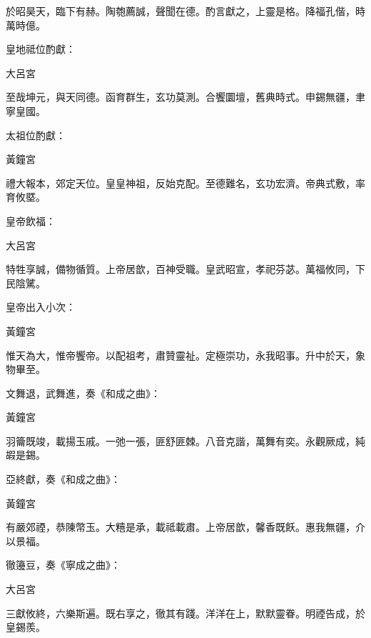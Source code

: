 \begin{pinyinscope}
 於昭昊天，臨下有赫。陶匏薦誠，聲聞在德。酌言獻之，上靈是格。降福孔偕，時萬時億。



 皇地祗位酌獻：



 大呂宮



 至哉坤元，與天同德。函育群生，玄功莫測。合饗圜壇，舊典時式。申錫無疆，聿寧皇國。



 太祖位酌獻：



 黃鐘宮



 禮大報本，郊定天位。皇皇神祖，反始克配。至德難名，玄功宏濟。帝典式敷，率育攸塈。



 皇帝飲福：



 大呂宮



 特牲享誠，備物循質。上帝居歆，百神受職。皇武昭宣，孝祀芬苾。萬福攸同，下民陰騭。



 皇帝出入小次：



 黃鐘宮



 惟天為大，惟帝饗帝。以配祖考，肅贊靈祉。定極崇功，永我昭事。升中於天，象物畢至。



 文舞退，武舞進，奏《和成之曲》：



 黃鐘宮



 羽籥既竣，載揚玉戚。一弛一張，匪舒匪棘。八音克諧，萬舞有奕。永觀厥成，純嘏是錫。



 亞終獻，奏《和成之曲》：



 黃鐘宮



 有嚴郊禋，恭陳幣玉。大糦是承，載祗載肅。上帝居歆，馨香既飫。惠我無疆，介以景福。



 徹籩豆，奏《寧成之曲》：



 大呂宮



 三獻攸終，六樂斯遍。既右享之，徹其有踐。洋洋在上，默默靈眷。明禋告成，於皇錫羨。




\end{pinyinscope}
